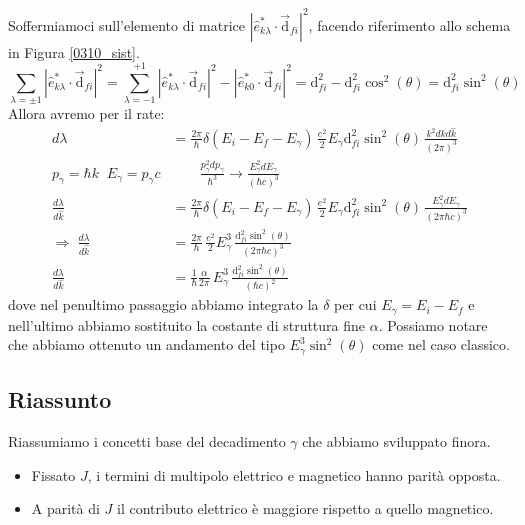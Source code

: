 \newline
\noindent Soffermiamoci sull'elemento di matrice $|\hat{e}^*_{k\lambda}\cdot \vec{\mathrm{d}}_{fi}|^2$, facendo riferimento allo schema in Figura \ref{0310_sist}.
$$\sum_{\lambda = \pm 1}|\hat{e}^*_{k\lambda}\cdot \vec{\mathrm{d}}_{fi}|^2 = \sum_{\lambda=-1}^{+1} |\hat{e}^*_{k\lambda}\cdot \vec{\mathrm{d}}_{fi}|^2 - |\hat{e}^*_{k0}\cdot \vec{\mathrm{d}}_{fi}|^2 = \mathrm{d}_{fi}^2 -\mathrm{d}_{fi}^2\cos^2{(\theta)} = \mathrm{d}_{fi}^2 \sin^2{(\theta)} $$
Allora avremo per il rate:
\begin{displaymath}
\begin{aligned}
d\lambda &= \frac{2\pi}{\hbar} \delta(E_i-E_f-E_\gamma) \,\frac{e^2}{2}E_\gamma \mathrm{d}_{fi}^2 \sin^2(\theta) \,  \frac{k^2dkd\hat{k}}{(2\pi)^3} \\
%
p_\gamma = \hbar k \;\; E_\gamma = p_\gamma c &\qquad\frac{p^2_\gamma dp_\gamma}{\hbar^3} \to \frac{E_\gamma^2 dE_\gamma}{(\hbar c)^3}\\
%
\frac{d\lambda}{d\hat{k}} &= \frac{2\pi}{\hbar} \delta(E_i-E_f-E_\gamma) \,\frac{e^2}{2}E_\gamma \mathrm{d}_{fi}^2 \sin^2(\theta) \, \frac{E_\gamma^2 dE_\gamma}{(2\pi\hbar c)^3} \\
%
\Rightarrow \; \frac{d\lambda}{d\hat{k}} &= \frac{2\pi}{\hbar} \,\frac{e^2}{2}E_\gamma^3 \, \frac{\mathrm{d}_{fi}^2 \sin^2(\theta)}{(2\pi \hbar c)^3} \\
%
\frac{d\lambda}{d\hat{k}} &= \frac{1}{\hbar} \frac{\alpha}{2\pi}\,E_\gamma^3 \, \frac{\mathrm{d}_{fi}^2 \sin^2(\theta)}{( \hbar c)^2}
\end{aligned}
\end{displaymath}
dove nel penultimo passaggio abbiamo integrato la $\delta$ per cui $E_\gamma = E_i - E_f$ e nell'ultimo abbiamo sostituito la costante di struttura fine $\alpha$. Possiamo notare che abbiamo ottenuto un andamento del tipo $E^3_\gamma \sin^2(\theta)$ come nel caso classico.

\subsection{Riassunto}
Riassumiamo i concetti base del decadimento $\gamma$ che abbiamo sviluppato finora.
\begin{itemize}
    \item Fissato $J$, i termini di multipolo elettrico e magnetico hanno parità opposta.
    \item A parità di $J$ il contributo elettrico è maggiore rispetto a quello magnetico.
\end{itemize}

